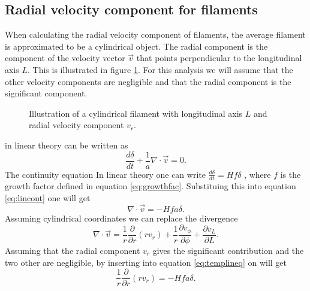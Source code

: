 \subsection{Radial velocity component for filaments}
When calculating the radial velocity component of filaments, the average filament is
approximated to be a cylindrical object. The radial component is the component of
the velocity vector $\vec{v}$ that points perpendicular to the longitudinal axis
$L$. This is illustrated in figure \ref{fig:filamentvr}. For this analysis we
will assume that the other velocity components are negligible and that the
radial component is the significant component.
\begin{figure}\label{fig:filamentvr}
    \caption{Illustration of a cylindrical filament with longitudinal axis $L$ and radial velocity component $v_r$.}
\end{figure}
in linear theory can be written as
\begin{equation}\label{eq:lincont}
    \frac{d\delta}{dt}+\frac{1}{a}\nabla\cdot\vec{v}=0.
\end{equation}
 The continuity equation In linear theory one can write
 $\frac{d\delta}{dt}=Hf\delta$ \cite[p.~347]{schneider2006extragalactic}, where $f$ is the growth factor
defined in equation \ref{eq:growthfac}. Substituing this into equation
\ref{eq:lincont} one will get
\begin{equation}\label{eq:templineq}
    \nabla\cdot\vec{v}=-Hfa\delta.
\end{equation}
Assuming cylindrical coordinates we can replace the
divergence
\begin{equation}
    \nabla\cdot\vec{v}=\frac{1}{r}\frac{\partial}{\partial r}(rv_r)+\frac{1}{r}\frac{\partial v_\phi}{\partial \phi} +\frac{\partial v_L}{\partial L}.
\end{equation}
Assuming that the radial component $v_r$ gives the significant contribution and
the two other are negligible, by inserting into equation \ref{eq:templineq} on
will get
\begin{equation}
    \frac{1}{r}\frac{\partial}{\partial r}(rv_r)=-Hfa\delta.
\end{equation}
